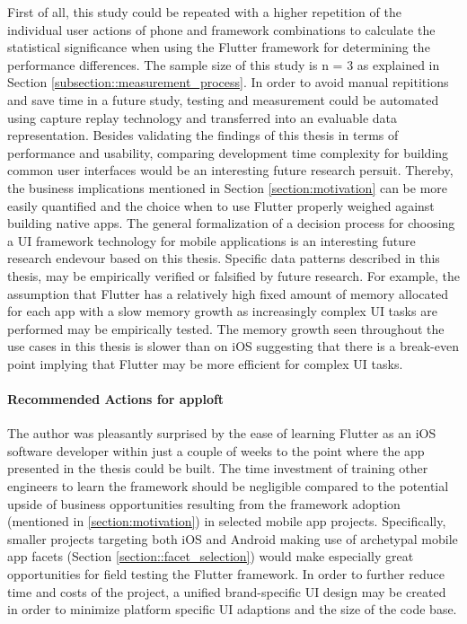 First of all, this study could be repeated with a higher repetition of the individual user actions of phone and framework combinations
to calculate the statistical significance when using the Flutter framework for determining the performance differences.
The sample size of this study is n = 3 as explained in Section \ref{subsection::measurement_process}.
In order to avoid manual repititions and save time in a future study, testing and measurement could be automated using
capture replay technology and transferred into an evaluable data representation.
Besides validating the findings of this thesis in terms of performance and usability, comparing development time complexity for building common user interfaces
would be an interesting future research persuit. Thereby, the business implications mentioned in Section \ref{section:motivation} can be more easily quantified and the choice when to use Flutter 
properly weighed against building native apps.
The general formalization of a decision process for choosing a UI framework technology for mobile applications is an interesting future research endevour based on this thesis.
Specific data patterns described in this thesis, may be empirically verified or falsified by future research.
For example, the assumption that Flutter has a relatively high fixed amount of memory allocated for each app with a slow memory growth as increasingly complex UI tasks are performed may be empirically tested.
The memory growth seen throughout the use cases in this thesis is slower than on iOS suggesting that there is a break-even point implying that Flutter may be more efficient for complex UI tasks.
\paragraph*{Recommended Actions for apploft}
The author was pleasantly surprised by the ease of learning Flutter as an iOS software developer within just a couple of weeks to the point where 
the app presented in the thesis could be built. The time investment of training other engineers to learn the framework should be negligible compared to the potential upside of business opportunities
resulting from the framework adoption (mentioned in \ref{section:motivation}) in selected mobile app projects.
Specifically, smaller projects targeting both iOS and Android making use of archetypal mobile app facets (Section \ref{section::facet_selection})
would make especially great opportunities for field testing the Flutter framework.
In order to further reduce time and costs of the project, a unified brand-specific UI design may be created in order to minimize platform specific
UI adaptions and the size of the code base.